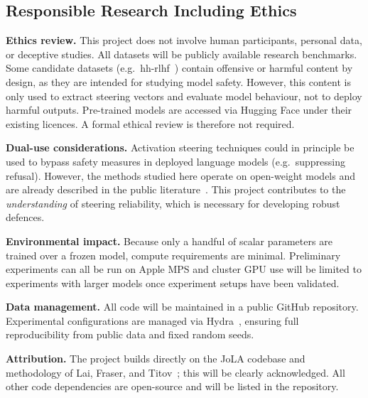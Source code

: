 \subsection{Responsible Research Including Ethics}

\textbf{Ethics review.} This project does not involve human participants, personal data, or deceptive studies.
All datasets will be publicly available research benchmarks. Some candidate datasets (e.g.\ hh-rlhf~\cite{bai2022hhrlhf}) contain offensive or harmful content by design, as they are intended for studying model safety. However, this content is only used to extract steering vectors and evaluate model behaviour, not to deploy harmful outputs.
Pre-trained models are accessed via Hugging Face under their existing licences.
A formal ethical review is therefore not required.

\textbf{Dual-use considerations.} Activation steering techniques could in principle be used to bypass safety measures in deployed language models (e.g.\ suppressing refusal).
However, the methods studied here operate on open-weight models and are already described in the public literature~\cite{arditi2024refusal,rimsky2024caa}.
This project contributes to the \emph{understanding} of steering reliability, which is necessary for developing robust defences.

\textbf{Environmental impact.} Because only a handful of scalar parameters are trained over a frozen model, compute requirements are minimal.
Preliminary experiments can all be run on Apple MPS and cluster GPU use will be limited to experiments with larger models once experiment setups have been validated.

\textbf{Data management.} All code will be maintained in a public GitHub repository.
Experimental configurations are managed via Hydra~\cite{yadan2019hydra}, ensuring full reproducibility from public data and fixed random seeds.

\textbf{Attribution.} The project builds directly on the JoLA codebase and methodology of Lai, Fraser, and Titov~\cite{lai2025jola}; this will be clearly acknowledged.
All other code dependencies are open-source and will be listed in the repository.
